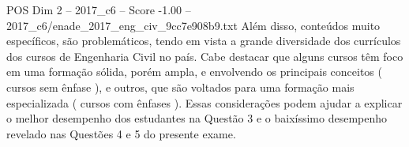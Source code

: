 \begin{textsample}{POS Dim 2 – 2017\_c6 – Score -1.00 – 2017\_c6/enade\_2017\_eng\_civ\_9cc7e908b9.txt}
Além disso, conteúdos muito específicos, são problemáticos, tendo em vista a grande diversidade dos currículos dos cursos de Engenharia Civil no país.
Cabe destacar que alguns cursos têm foco em uma formação sólida, porém ampla, e envolvendo os principais conceitos ( cursos sem ênfase ), e outros, que são voltados para uma formação mais especializada ( cursos com ênfases ).
Essas considerações podem ajudar a explicar o melhor desempenho dos estudantes na Questão 3 e o baixíssimo desempenho revelado nas Questões 4 e 5 do presente exame.

\end{textsample}
